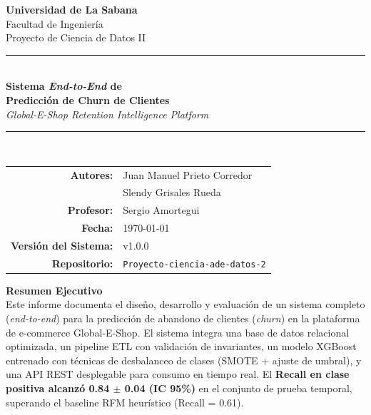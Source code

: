 \documentclass[12pt, letterpaper]{article}
\begin{document}
\begin{titlepage}
  \centering
  \vspace*{1cm}

  {\LARGE \textbf{Universidad de La Sabana}}\\[0.3cm]
  {\large Facultad de Ingeniería}\\[0.1cm]
  {\large Proyecto de Ciencia de Datos II}\\[2cm]

  {\rule{\linewidth}{0.5pt}}\\[0.4cm]
  {\Huge \textbf{Sistema \textit{End-to-End} de\\[0.2cm]
  Predicción de Churn de Clientes}}\\[0.3cm]
  {\Large \textit{Global-E-Shop Retention Intelligence Platform}}\\[0.3cm]
  {\rule{\linewidth}{0.5pt}}\\[1.5cm]

  \begin{tabular}{rl}
    \textbf{Autores:} & Juan Manuel Prieto Corredor \\
                     & Slendy Grisales Rueda \\[0.2cm]
    \textbf{Profesor:} & Sergio Amortegui \\[0.2cm]
    \textbf{Fecha:}   & \today \\[0.2cm]
    \textbf{Versión del Sistema:} & v1.0.0 \\[0.2cm]
    \textbf{Repositorio:} & \texttt{Proyecto-ciencia-ade-datos-2} \\
  \end{tabular}

  \vfill

  \begin{tcolorbox}[colback=retaingreen!10, colframe=retaingreen, width=0.85\textwidth]
    \centering
    \textbf{Resumen Ejecutivo}\\[0.3cm]
    Este informe documenta el diseño, desarrollo y evaluación de un sistema
    completo (\textit{end-to-end}) para la predicción de abandono de clientes
    (\textit{churn}) en la plataforma de e-commerce Global-E-Shop.
    El sistema integra una base de datos relacional optimizada, un pipeline
    ETL con validación de invariantes, un modelo XGBoost entrenado con técnicas
    de desbalanceo de clases (SMOTE + ajuste de umbral), y una API REST
    desplegable para consumo en tiempo real. El \textbf{Recall en clase positiva
    alcanzó 0.84 $\pm$ 0.04 (IC 95\%)} en el conjunto de prueba temporal,
    superando el baseline RFM heurístico (Recall = 0.61).
  \end{tcolorbox}
\end{titlepage}
\end{document}

